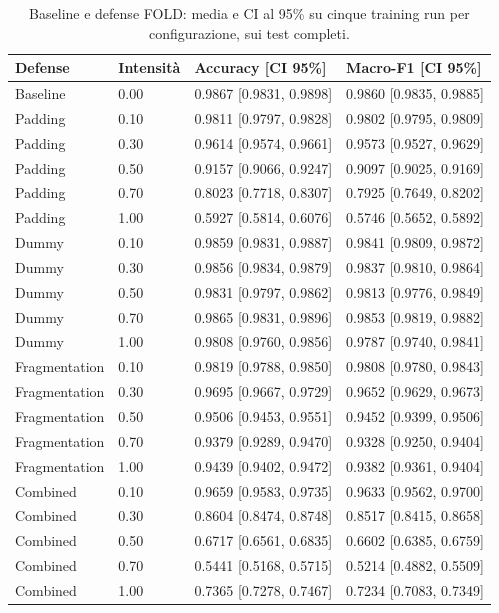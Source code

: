 \documentclass[11pt,a4paper]{article}
\begin{document}
\clearpage
\begin{table}[htbp]
\centering\scriptsize
\caption{Baseline e defense FOLD: media e CI al 95\% su cinque training run per configurazione, sui test completi.}
\label{tab:crossrun-defense-performance-fold}
\begin{tabular}{llll}
\toprule
Defense & Intensità & Accuracy [CI 95\%] & Macro-F1 [CI 95\%] \\
\midrule
Baseline & 0.00 & 0.9867 [0.9831, 0.9898] & 0.9860 [0.9835, 0.9885] \\
Padding & 0.10 & 0.9811 [0.9797, 0.9828] & 0.9802 [0.9795, 0.9809] \\
Padding & 0.30 & 0.9614 [0.9574, 0.9661] & 0.9573 [0.9527, 0.9629] \\
Padding & 0.50 & 0.9157 [0.9066, 0.9247] & 0.9097 [0.9025, 0.9169] \\
Padding & 0.70 & 0.8023 [0.7718, 0.8307] & 0.7925 [0.7649, 0.8202] \\
Padding & 1.00 & 0.5927 [0.5814, 0.6076] & 0.5746 [0.5652, 0.5892] \\
Dummy & 0.10 & 0.9859 [0.9831, 0.9887] & 0.9841 [0.9809, 0.9872] \\
Dummy & 0.30 & 0.9856 [0.9834, 0.9879] & 0.9837 [0.9810, 0.9864] \\
Dummy & 0.50 & 0.9831 [0.9797, 0.9862] & 0.9813 [0.9776, 0.9849] \\
Dummy & 0.70 & 0.9865 [0.9831, 0.9896] & 0.9853 [0.9819, 0.9882] \\
Dummy & 1.00 & 0.9808 [0.9760, 0.9856] & 0.9787 [0.9740, 0.9841] \\
Fragmentation & 0.10 & 0.9819 [0.9788, 0.9850] & 0.9808 [0.9780, 0.9843] \\
Fragmentation & 0.30 & 0.9695 [0.9667, 0.9729] & 0.9652 [0.9629, 0.9673] \\
Fragmentation & 0.50 & 0.9506 [0.9453, 0.9551] & 0.9452 [0.9399, 0.9506] \\
Fragmentation & 0.70 & 0.9379 [0.9289, 0.9470] & 0.9328 [0.9250, 0.9404] \\
Fragmentation & 1.00 & 0.9439 [0.9402, 0.9472] & 0.9382 [0.9361, 0.9404] \\
Combined & 0.10 & 0.9659 [0.9583, 0.9735] & 0.9633 [0.9562, 0.9700] \\
Combined & 0.30 & 0.8604 [0.8474, 0.8748] & 0.8517 [0.8415, 0.8658] \\
Combined & 0.50 & 0.6717 [0.6561, 0.6835] & 0.6602 [0.6385, 0.6759] \\
Combined & 0.70 & 0.5441 [0.5168, 0.5715] & 0.5214 [0.4882, 0.5509] \\
Combined & 1.00 & 0.7365 [0.7278, 0.7467] & 0.7234 [0.7083, 0.7349] \\
\bottomrule
\end{tabular}
\end{table}
\end{document}
